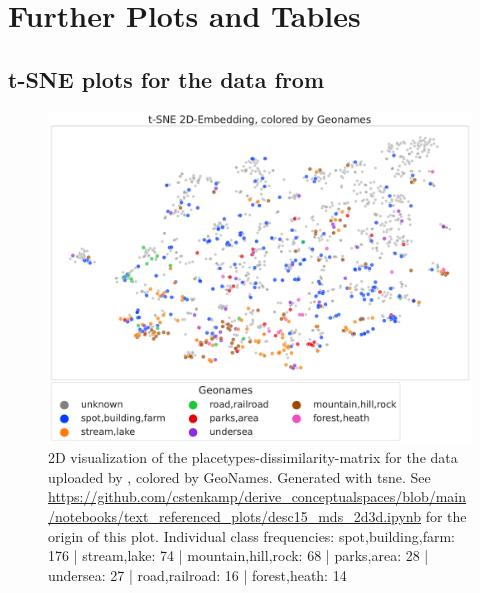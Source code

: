 \chapter{Further Plots and Tables}
\label{ap:more_plots}

\section{t-SNE plots for the data from \cite{Derrac2015}}

\begin{figure}[h]
	\begin{center}
	  \includegraphics[width=\textwidth]{graphics/figures/scatter_mds_tsne_places_Geonames.pdf}
	  \caption[2D visualization of the placetypes-dissimilarity-matrix.]{2D visualization of the placetypes-dissimilarity-matrix for the data uploaded by \textcite{Derrac2015}, colored by GeoNames. Generated with \gls{tsne}. See \url{https://github.com/cstenkamp/derive_conceptualspaces/blob/main/notebooks/text_referenced_plots/desc15_mds_2d3d.ipynb} for the origin of this plot. Individual class frequencies: spot,building,farm: 176 | stream,lake: 74 | mountain,hill,rock: 68 | parks,area: 28 | undersea: 27 | road,railroad: 16 | forest,heath: 14}
	  \label{fig:scatter_mds_placetypes}
	\end{center}
\end{figure}

